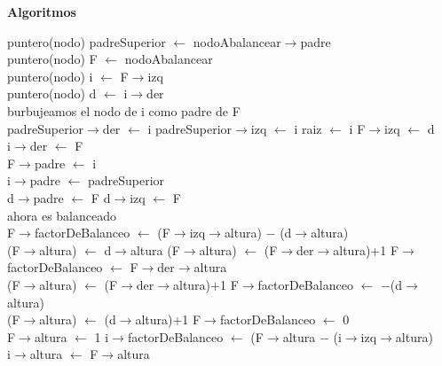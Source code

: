 \documentclass[a4paper,10pt]{article}
\newenvironment{Algoritmos}{%
  \vspace*{2ex}%
  \noindent\textbf{\Large Algoritmos}%
  \vspace*{2ex}%
}{}
\begin{document}
\begin{Algoritmos}
\newpage
{}
\newline
\begin{algorithm}[H]
{puntero(nodo) padreSuperior $\leftarrow$ nodoAbalancear$\rightarrow$padre\\}
{puntero(nodo) F $\leftarrow$ nodoAbalancear\\}
{puntero(nodo) i $\leftarrow$ F$\rightarrow$izq\\}
{puntero(nodo) d $\leftarrow$ i$\rightarrow$der\\}
{burbujeamos el nodo de i como padre de F\\}
{
{
{padreSuperior$\rightarrow$der $\leftarrow$ i}
{padreSuperior$\rightarrow$izq $\leftarrow$ i}
}
{raiz $\leftarrow$ i}
}
{F$\rightarrow$izq $\leftarrow$ d\\}
{i$\rightarrow$der $\leftarrow$ F\\}
{F$\rightarrow$padre $\leftarrow$ i\\}
{i$\rightarrow$padre $\leftarrow$ padreSuperior\\}
{
{d$\rightarrow$padre $\leftarrow$ F}
{}
}
{d$\rightarrow$izq $\leftarrow$ F\\}
{ahora es balanceado\\}
{
{
{F$\rightarrow$factorDeBalanceo $\leftarrow$ (F$\rightarrow$izq$\rightarrow$altura) $-$ (d$\rightarrow$altura) \\
{
{(F$\rightarrow$altura) $\leftarrow$ d$\rightarrow$altura}
{(F$\rightarrow$altura) $\leftarrow$ (F$\rightarrow$der$\rightarrow$altura)+1}
}
}
{F$\rightarrow$factorDeBalanceo $\leftarrow$ F$\rightarrow$der$\rightarrow$altura \\
(F$\rightarrow$altura) $\leftarrow$ (F$\rightarrow$der$\rightarrow$altura)+1
}
}
{
{F$\rightarrow$factorDeBalanceo $\leftarrow$ $-$(d$\rightarrow$altura)\\
(F$\rightarrow$altura) $\leftarrow$ (d$\rightarrow$altura)+1}
{F$\rightarrow$factorDeBalanceo $\leftarrow$ 0\\
 F$\rightarrow$altura $\leftarrow$ 1}
}
{i$\rightarrow$factorDeBalanceo $\leftarrow$ (F$\rightarrow$altura $-$ (i$\rightarrow$izq$\rightarrow$altura) \\}
{
{i$\rightarrow$altura $\leftarrow$ F$\rightarrow$altura}
}}
\end{algorithm}
\end{Algoritmos}
\end{document}
